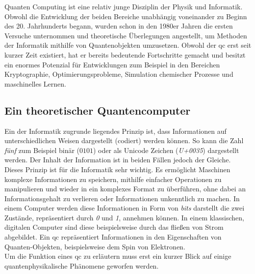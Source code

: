 Quanten Computing ist eine relativ junge Disziplin der Physik und Informatik. Obwohl die Entwicklung der beiden Bereiche unabhängig voneinander zu Beginn des 20. Jahrhunderts begann, wurden schon in den 1980er Jahren die ersten Versuche unternommen und theoretische Überlegungen angestellt, um Methoden der Informatik mithilfe von Quantenobjekten umzusetzen. Obwohl der \ac{qc} erst seit kurzer Zeit existiert, hat er bereits bedeutende Fortschritte gemacht und besitzt ein enormes Potenzial für Entwicklungen zum Beispiel in den Bereichen Kryptographie, Optimierungsprobleme, Simulation chemischer Prozesse und maschinelles Lernen.

\subsection{Ein theoretischer Quantencomputer}
Ein der Informatik zugrunde liegendes Prinzip ist, dass \cite[S122]{steane_quantum_1998} Informationen auf unterschiedlichen Weisen dargestellt (codiert) werden können. So kann die Zahl \textit{fünf} zum Beispiel binär ($0101$) oder als Unicode Zeichen (\textit{U+0035}) dargestellt werden. Der Inhalt der Information ist in beiden Fällen jedoch der Gleiche.\\
Dieses Prinzip ist für die Informatik sehr wichtig. Es ermöglicht Maschinen komplexe Informationen zu speichern, mithilfe einfacher Operationen zu manipulieren und wieder in ein komplexes Format zu überführen, ohne dabei an Informationsgehalt zu verlieren oder Informationen unkenntlich zu machen. In einem Computer werden diese Informationen in Form von \textit{bits} darstellt die zwei Zustände, repräsentiert durch \textit{0} und \textit{1}, annehmen können. In einem klassischen, digitalen Computer sind diese beispielsweise durch das fließen von Strom abgebildet. Ein \ac{qc} repräsentiert Informationen in den Eigenschaften von Quanten-Objekten, beispielsweise dem Spin von Elektronen.\\
Um die Funktion eines \ac{qc} zu erläutern muss erst ein kurzer Blick auf einige quantenphysikalische Phänomene geworfen werden.

